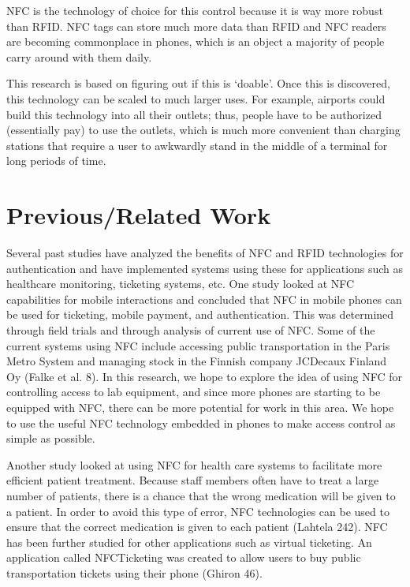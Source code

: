 \documentclass{sigchi}
\begin{document}
NFC is the technology of choice for this control because it is way more robust than RFID. NFC tags can store much more data than RFID and NFC readers are becoming commonplace in phones, which is an object a majority of people carry around with them daily.

This research is based on figuring out if this is ‘doable’. Once this is discovered, this technology can be scaled to much larger uses. For example, airports could build this technology into all their outlets; thus, people have to be authorized (essentially pay) to use the outlets, which is much more convenient than charging stations that require a user to awkwardly stand in the middle of a terminal for long periods of time. 

\section{Previous/Related Work}

Several past studies have analyzed the benefits of NFC and RFID technologies for authentication and have implemented systems using these for applications such as healthcare monitoring, ticketing systems, etc. One study looked at NFC capabilities for mobile interactions and concluded that NFC in mobile phones can be used for ticketing, mobile payment, and authentication. This was determined through field trials and through analysis of current use of NFC. Some of the current systems using NFC include accessing public transportation in the Paris Metro System and managing stock in the Finnish company JCDecaux Finland Oy (Falke et al. 8). In this research, we hope to explore the idea of using NFC for controlling access to lab equipment, and since more phones are starting to be equipped with NFC, there can be more potential for work in this area. We hope to use the useful NFC technology embedded in phones to make access control as simple as possible.

Another study looked at using NFC for health care systems to facilitate more efficient patient treatment. Because staff members often have to treat a large number of patients, there is a chance that the wrong medication will be given to a patient. In order to avoid this type of error, NFC technologies can be used to ensure that the correct medication is given to each patient (Lahtela 242). NFC has been further studied for other applications such as virtual ticketing. An application called NFCTicketing was created to allow users to buy public transportation tickets using their phone (Ghiron 46). 
\end{document}
